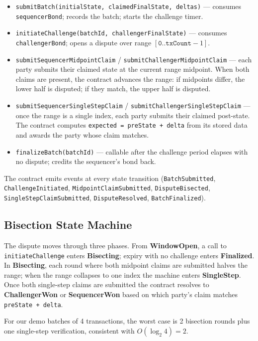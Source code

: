 \documentclass[11pt,letterpaper]{article}
\begin{document}
\begin{itemize}[leftmargin=*, itemsep=2pt]
    \item \texttt{submitBatch(initialState, claimedFinalState, deltas)} --- consumes \texttt{sequencerBond}; records the batch; starts the challenge timer.
    \item \texttt{initiateChallenge(batchId, challengerFinalState)} --- consumes \texttt{challengerBond}; opens a dispute over range $[\texttt{0}..\texttt{txCount}-1]$.
    \item \texttt{submitSequencerMidpointClaim} / \texttt{submitChallengerMidpointClaim} --- each party submits their claimed state at the current range midpoint. When both claims are present, the contract advances the range: if midpoints differ, the lower half is disputed; if they match, the upper half is disputed.
    \item \texttt{submitSequencerSingleStepClaim} / \texttt{submitChallengerSingleStepClaim} --- once the range is a single index, each party submits their claimed post-state. The contract computes \texttt{expected = preState + delta} from its stored data and awards the party whose claim matches.
    \item \texttt{finalizeBatch(batchId)} --- callable after the challenge period elapses with no dispute; credits the sequencer's bond back.
\end{itemize}

The contract emits events at every state transition (\texttt{BatchSubmitted}, \texttt{ChallengeInitiated}, \texttt{MidpointClaimSubmitted}, \texttt{DisputeBisected}, \texttt{SingleStepClaimSubmitted}, \texttt{DisputeResolved}, \texttt{BatchFinalized}).

\subsection{Bisection State Machine}

The dispute moves through three phases. From \textbf{WindowOpen}, a call to \texttt{initiateChallenge} enters \textbf{Bisecting}; expiry with no challenge enters \textbf{Finalized}. In \textbf{Bisecting}, each round where both midpoint claims are submitted halves the range; when the range collapses to one index the machine enters \textbf{SingleStep}. Once both single-step claims are submitted the contract resolves to \textbf{ChallengerWon} or \textbf{SequencerWon} based on which party's claim matches \texttt{preState + delta}.

For our demo batches of 4 transactions, the worst case is 2 bisection rounds plus one single-step verification, consistent with $O(\log_2 4) = 2$.
\end{document}

